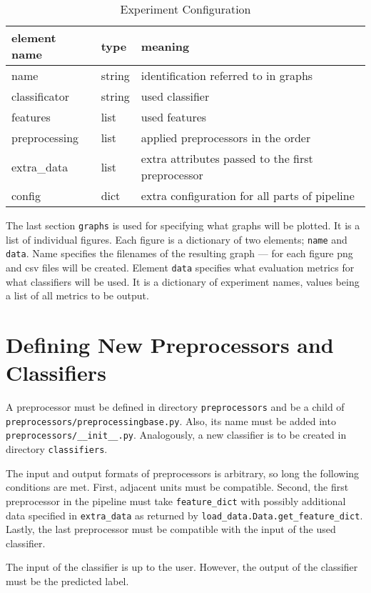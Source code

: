 \begin{table}[h!]

\centering
\begin{tabular}{lll}
\toprule
\textbf{element name} & \textbf{type} & \textbf{meaning}\\
\midrule
name 			& string	& identification referred to in graphs\\
classificator 	& string	& used classifier\\
features 		& list		& used features \\
preprocessing 	& list		& applied preprocessors in the order\\
extra\_data 	& list 		& extra attributes passed to the first preprocessor \\
config			& dict		& extra configuration for all parts of pipeline \\
\bottomrule
\end{tabular}

\caption{Experiment Configuration}\label{tab:exp_dict}
\end{table}


The last section \texttt{graphs} is used for specifying what graphs will be plotted.
It is a list of individual figures.
Each figure is a dictionary of two elements; \texttt{name} and \texttt{data}.
Name specifies the filenames of the resulting graph ---
for each figure png and csv files will be created.
Element \texttt{data} specifies what evaluation metrics for what classifiers will be used.
It is a dictionary of experiment names, values being a list of all metrics to be output.


\section{Defining New Preprocessors and Classifiers}

A preprocessor must be defined in directory \texttt{preprocessors} and be a child of \texttt{preprocessors/preprocessingbase.py}.
Also, its name must be added into \texttt{preprocessors/\_\_init\_\_.py}.
Analogously, a new classifier is to be created in directory \texttt{classifiers}.

The input and output formats of preprocessors is arbitrary, so long the following conditions are met.
First, adjacent units must be compatible.
Second, the first preprocessor in the pipeline must take \texttt{feature\_dict} with possibly additional data specified in \texttt{extra\_data} as returned by \texttt{load\_data.Data.get\_feature\_dict}.
Lastly, the last preprocessor must be compatible with the input of the used classifier.

The input of the classifier is up to the user.
However, the output of the classifier must be the predicted label.
